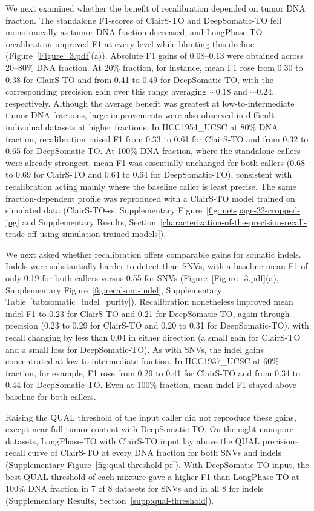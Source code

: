 \documentclass[unnumsec,webpdf,contemporary,large]{oup-authoring-template}
\begin{document}
We next examined whether the benefit of recalibration depended on tumor DNA fraction. The standalone F1-scores of ClairS-TO and DeepSomatic-TO fell monotonically as tumor DNA fraction decreased, and LongPhase-TO recalibration improved F1 at every level while blunting this decline (Figure~\ref{Figure_3.pdf}(a)). Absolute F1 gains of 0.08--0.13 were obtained across 20--80\% DNA fraction. At 20\% fraction, for instance, mean F1 rose from 0.30 to 0.38 for ClairS-TO and from 0.41 to 0.49 for DeepSomatic-TO, with the corresponding precision gain over this range averaging $\sim$0.18 and $\sim$0.24, respectively. Although the average benefit was greatest at low-to-intermediate tumor DNA fractions, large improvements were also observed in difficult individual datasets at higher fractions. In HCC1954\_UCSC at 80\% DNA fraction, recalibration raised F1 from 0.33 to 0.61 for ClairS-TO and from 0.32 to 0.65 for DeepSomatic-TO. At 100\% DNA fraction, where the standalone callers were already strongest, mean F1 was essentially unchanged for both callers (0.68 to 0.69 for ClairS-TO and 0.64 to 0.64 for DeepSomatic-TO), consistent with recalibration acting mainly where the baseline caller is least precise. The same fraction-dependent profile was reproduced with a ClairS-TO model trained on simulated data (ClairS-TO-ss, Supplementary Figure~\ref{fig:met-page-32-cropped-jpg} and Supplementary Results, Section~\ref{characterization-of-the-precision-recall-trade-off-using-simulation-trained-models}).

We next asked whether recalibration offers comparable gains for somatic indels. Indels were substantially harder to detect than SNVs, with a baseline mean F1 of only 0.19 for both callers versus 0.55 for SNVs (Figure~\ref{Figure_3.pdf}(a), Supplementary Figure~\ref{fig:recal-ont-indel}, Supplementary Table~\ref{tab:somatic_indel_purity}). Recalibration nonetheless improved mean indel F1 to 0.23 for ClairS-TO and 0.21 for DeepSomatic-TO, again through precision (0.23 to 0.29 for ClairS-TO and 0.20 to 0.31 for DeepSomatic-TO), with recall changing by less than 0.04 in either direction (a small gain for ClairS-TO and a small loss for DeepSomatic-TO). As with SNVs, the indel gains concentrated at low-to-intermediate fraction. In HCC1937\_UCSC at 60\% fraction, for example, F1 rose from 0.29 to 0.41 for ClairS-TO and from 0.34 to 0.44 for DeepSomatic-TO. Even at 100\% fraction, mean indel F1 stayed above baseline for both callers.

Raising the QUAL threshold of the input caller did not reproduce these gains, except near full tumor content with DeepSomatic-TO. On the eight nanopore datasets, LongPhase-TO with ClairS-TO input lay above the QUAL precision--recall curve of ClairS-TO at every DNA fraction for both SNVs and indels (Supplementary Figure~\ref{fig:qual-threshold-pr}). With DeepSomatic-TO input, the best QUAL threshold of each mixture gave a higher F1 than LongPhase-TO at 100\% DNA fraction in 7 of 8 datasets for SNVs and in all 8 for indels (Supplementary Results, Section~\ref{supp:qual-threshold}).
\end{document}
